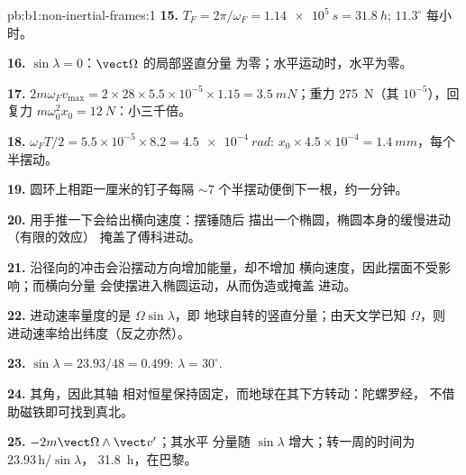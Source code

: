 \begin{solution}{pb:b1:non-inertial-frames:1}
\textbf{15.} $T_F = 2\pi/\omega_F = \qty{1.14e5}{s} = \qty{31.8}{h}$; $11.3^\circ$
每小时。

\textbf{16.} $\sin\lambda = 0$：$\vect\Omega$ 的局部竖直分量
为零；水平运动时，水平为零。

\textbf{17.} $2m\omega_Fv_{\max} = 2 \times 28 \times 5.5\times10^{-5} \times 1.15 =
\qty{3.5}{mN}$；重力 \qty{275}{N}（其 $10^{-5}$），回复力
$m\omega_0^2x_0 = \qty{12}{N}$：小三千倍。

\textbf{18.} $\omega_FT/2 = 5.5\times10^{-5} \times 8.2 = \qty{4.5e-4}{rad}$:
$x_0 \times 4.5\times10^{-4} = \qty{1.4}{mm}$，每个半摆动。

\textbf{19.} 圆环上相距一厘米的钉子每隔 $\sim 7$
个半摆动便倒下一根，约一分钟。

\textbf{20.} 用手推一下会给出横向速度：摆锤随后
描出一个椭圆，椭圆本身的缓慢进动（有限的效应）
掩盖了傅科进动。

\textbf{21.} 沿径向的冲击会沿摆动方向增加能量，却不增加
横向速度，因此摆面不受影响；而横向分量
会使摆进入椭圆运动，从而伪造或掩盖
进动。

\textbf{22.} 进动速率量度的是 $\Omega\sin\lambda$，即
地球自转的竖直分量；由天文学已知 $\Omega$，则
进动速率给出纬度（反之亦然）。

\textbf{23.} $\sin\lambda = 23.93/48 = 0.499$: $\lambda = 30^\circ$.

\textbf{24.} 其角，因此其轴
相对恒星保持固定，而地球在其下方转动：陀螺罗经，
不借助磁铁即可找到真北。

\textbf{25.}  $-2m\vect\Omega\wedge\vect v'$；其水平
分量随 $\sin\lambda$ 增大；转一周的时间为 $23.93\,\text{h}/\sin\lambda$，
\qty{31.8}{h}，在巴黎。
\end{solution}
